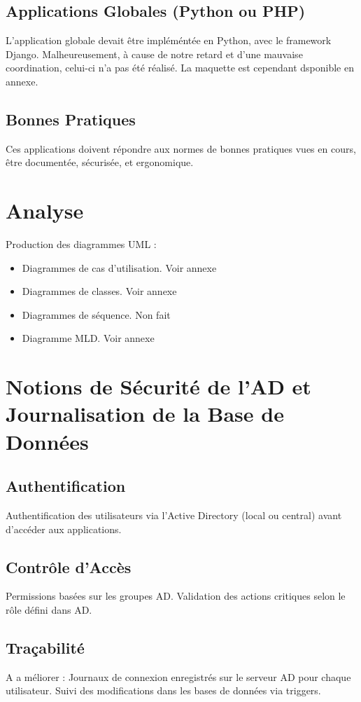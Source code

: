 \documentclass[a4paper,12pt]{report}
\begin{document}
\section{Applications Globales (Python ou PHP)}

L'application globale devait être impléméntée en Python, avec le framework Django. Malheureusement, à cause de notre retard et d'une mauvaise coordination, celui-ci n'a pas été réalisé. La maquette est cependant dsponible en annexe.

\section{Bonnes Pratiques}
Ces applications doivent répondre aux normes de bonnes pratiques vues en cours, être documentée, sécurisée, et ergonomique.

\chapter{Analyse}
Production des diagrammes UML :
\begin{itemize}
    \item Diagrammes de cas d'utilisation. Voir annexe
    \item Diagrammes de classes. Voir annexe
    \item Diagrammes de séquence. Non fait
    \item Diagramme MLD. Voir annexe
\end{itemize}

\chapter{Notions de Sécurité de l'AD et Journalisation de la Base de Données}
\section{Authentification}
Authentification des utilisateurs via l'Active Directory (local ou central) avant d'accéder aux applications.

\section{Contrôle d'Accès}
Permissions basées sur les groupes AD. Validation des actions critiques selon le rôle défini dans AD.

\section{Traçabilité}
A a méliorer : 
Journaux de connexion enregistrés sur le serveur AD pour chaque utilisateur. Suivi des modifications dans les bases de données via triggers.
\end{document}
